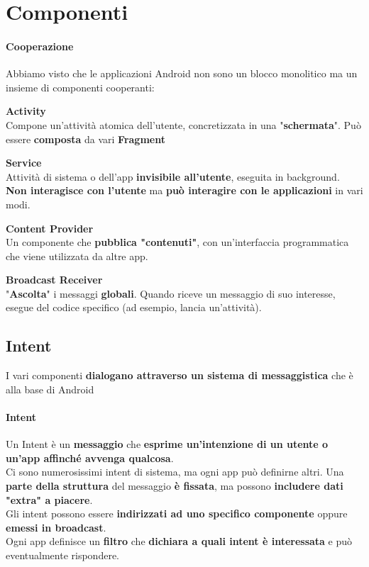 \documentclass[10pt]{book}
\begin{document}
\section{Componenti}
\paragraph{Cooperazione} Abbiamo visto che le applicazioni Android non sono un blocco monolitico ma un insieme di componenti cooperanti:
\begin{list}{}{}
	\item \textbf{Activity}\\
	Compone un'attività atomica dell'utente, concretizzata in una "\textbf{schermata}". Può essere \textbf{composta} da vari \textbf{Fragment}
	\item \textbf{Service}\\
	Attività di sistema o dell'app \textbf{invisibile all'utente}, eseguita in background. \textbf{Non interagisce con l'utente} ma \textbf{può interagire con le applicazioni} in vari modi.
	\item \textbf{Content Provider}\\
	Un componente che \textbf{pubblica "contenuti"}, con un'interfaccia programmatica che viene utilizzata da altre app.
	\item \textbf{Broadcast Receiver}\\
	"\textbf{Ascolta}" i messaggi \textbf{globali}. Quando riceve un messaggio di suo interesse, esegue del codice specifico (ad esempio, lancia un'attività).
\end{list}
\subsection{Intent}
I vari componenti \textbf{dialogano attraverso un sistema di messaggistica} che è alla base di Android
\paragraph{Intent} Un Intent è un \textbf{messaggio} che \textbf{esprime un'intenzione di un utente o un'app affinché avvenga qualcosa}.\\
Ci sono numerosissimi intent di sistema, ma ogni app può definirne altri. Una \textbf{parte della struttura} del messaggio \textbf{è fissata}, ma possono \textbf{includere dati "extra" a piacere}.\\
Gli intent possono essere \textbf{indirizzati ad uno specifico componente} oppure \textbf{emessi in broadcast}.\\
Ogni app definisce un \textbf{filtro} che \textbf{dichiara a quali intent è interessata} e può eventualmente rispondere.
\end{document}
